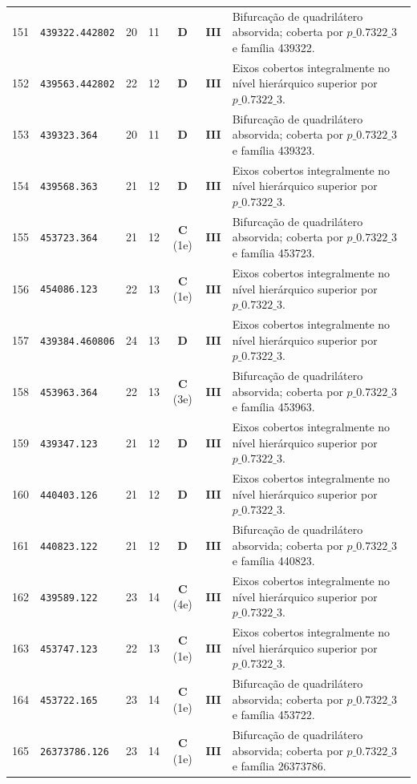 \documentclass[11pt,a4paper]{article}
\begin{document}
\begin{small}
\begin{longtable}{r l c c c c p{8.8cm}}
151 & \texttt{439322.442802} & 20 & 11 & \textbf{D} & \textbf{III} & Bifurcação de quadrilátero absorvida; coberta por $p\_0.7322\_3$ e família 439322. \\
152 & \texttt{439563.442802} & 22 & 12 & \textbf{D} & \textbf{III} & Eixos cobertos integralmente no nível hierárquico superior por $p\_0.7322\_3$. \\
153 & \texttt{439323.364} & 20 & 11 & \textbf{D} & \textbf{III} & Bifurcação de quadrilátero absorvida; coberta por $p\_0.7322\_3$ e família 439323. \\
154 & \texttt{439568.363} & 21 & 12 & \textbf{D} & \textbf{III} & Eixos cobertos integralmente no nível hierárquico superior por $p\_0.7322\_3$. \\
155 & \texttt{453723.364} & 21 & 12 & \textbf{C} (1e) & \textbf{III} & Bifurcação de quadrilátero absorvida; coberta por $p\_0.7322\_3$ e família 453723. \\
156 & \texttt{454086.123} & 22 & 13 & \textbf{C} (1e) & \textbf{III} & Eixos cobertos integralmente no nível hierárquico superior por $p\_0.7322\_3$. \\
157 & \texttt{439384.460806} & 24 & 13 & \textbf{D} & \textbf{III} & Eixos cobertos integralmente no nível hierárquico superior por $p\_0.7322\_3$. \\
158 & \texttt{453963.364} & 22 & 13 & \textbf{C} (3e) & \textbf{III} & Bifurcação de quadrilátero absorvida; coberta por $p\_0.7322\_3$ e família 453963. \\
159 & \texttt{439347.123} & 21 & 12 & \textbf{D} & \textbf{III} & Eixos cobertos integralmente no nível hierárquico superior por $p\_0.7322\_3$. \\
160 & \texttt{440403.126} & 21 & 12 & \textbf{D} & \textbf{III} & Eixos cobertos integralmente no nível hierárquico superior por $p\_0.7322\_3$. \\
161 & \texttt{440823.122} & 21 & 12 & \textbf{D} & \textbf{III} & Bifurcação de quadrilátero absorvida; coberta por $p\_0.7322\_3$ e família 440823. \\
162 & \texttt{439589.122} & 23 & 14 & \textbf{C} (4e) & \textbf{III} & Eixos cobertos integralmente no nível hierárquico superior por $p\_0.7322\_3$. \\
163 & \texttt{453747.123} & 22 & 13 & \textbf{C} (1e) & \textbf{III} & Eixos cobertos integralmente no nível hierárquico superior por $p\_0.7322\_3$. \\
164 & \texttt{453722.165} & 23 & 14 & \textbf{C} (1e) & \textbf{III} & Bifurcação de quadrilátero absorvida; coberta por $p\_0.7322\_3$ e família 453722. \\
165 & \texttt{26373786.126} & 23 & 14 & \textbf{C} (1e) & \textbf{III} & Bifurcação de quadrilátero absorvida; coberta por $p\_0.7322\_3$ e família 26373786. \\

\end{longtable}
\end{small}
\end{document}
